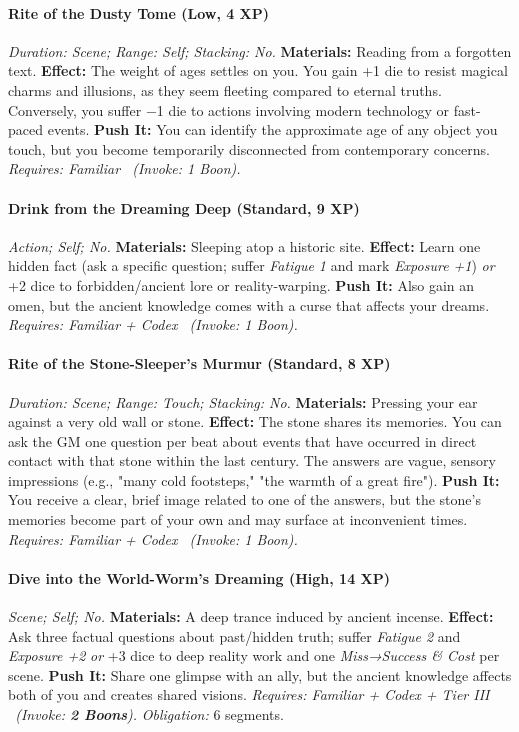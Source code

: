 \documentclass[12pt,twoside]{book}
\begin{document}
\paragraph{Rite of the Dusty Tome (Low, 4 XP)} \emph{Duration: Scene; Range: Self; Stacking: No.}
\textbf{Materials:} Reading from a forgotten text.
\textbf{Effect:} The weight of ages settles on you. You gain +1 die to resist magical charms and illusions, as they seem fleeting compared to eternal truths. Conversely, you suffer −1 die to actions involving modern technology or fast-paced events.
\textbf{Push It:} You can identify the approximate age of any object you touch, but you become temporarily disconnected from contemporary concerns.
\emph{Requires: Familiar \ (\textit{Invoke:} 1 Boon).}
\paragraph{Drink from the Dreaming Deep (Standard, 9 XP)} \emph{Action; Self; No.}
\textbf{Materials:} Sleeping atop a historic site.
\textbf{Effect:} Learn one hidden fact (ask a specific question; suffer \emph{Fatigue 1} and mark \emph{Exposure +1}) \emph{or} +2 dice to forbidden/ancient lore or reality-warping.
\textbf{Push It:} Also gain an omen, but the ancient knowledge comes with a curse that affects your dreams.
\emph{Requires: Familiar + Codex \ (\textit{Invoke:} 1 Boon).}
\paragraph{Rite of the Stone-Sleeper's Murmur (Standard, 8 XP)} \emph{Duration: Scene; Range: Touch; Stacking: No.}
\textbf{Materials:} Pressing your ear against a very old wall or stone.
\textbf{Effect:} The stone shares its memories. You can ask the GM one question per beat about events that have occurred in direct contact with that stone within the last century. The answers are vague, sensory impressions (e.g., "many cold footsteps," "the warmth of a great fire").
\textbf{Push It:} You receive a clear, brief image related to one of the answers, but the stone's memories become part of your own and may surface at inconvenient times.
\emph{Requires: Familiar + Codex \ (\textit{Invoke:} 1 Boon).}
\paragraph{Dive into the World-Worm's Dreaming (High, 14 XP)} \emph{Scene; Self; No.}
\textbf{Materials:} A deep trance induced by ancient incense.
\textbf{Effect:} Ask three factual questions about past/hidden truth; suffer \emph{Fatigue 2} and \emph{Exposure +2} \emph{or} +3 dice to deep reality work and one \emph{Miss→Success \& Cost} per scene.
\textbf{Push It:} Share one glimpse with an ally, but the ancient knowledge affects both of you and creates shared visions.
\emph{Requires: Familiar + Codex + Tier III \ (\textit{Invoke:} \textbf{2 Boons}).}
\emph{Obligation:} 6 segments.
\end{document}
